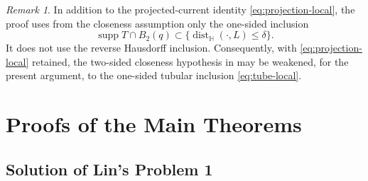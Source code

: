 \documentclass[11pt,reqno]{amsart}
\numberwithin{equation}{section}
\theoremstyle{definition}
\theoremstyle{remark}
\newtheorem{remark}[remark]{Remark}
\newcommand{\Hyp}{\mathbb H}
\newcommand{\supp}{\operatorname{supp}}
\newcommand{\dist}{\operatorname{dist}}
\begin{document}
\begin{remark}\label{rem:one-sided}
In addition to the projected-current identity
\eqref{eq:projection-local}, the proof uses from the closeness
assumption only the one-sided inclusion
\[
 \supp T\cap B_2(q)
 \subset \{\dist_{\Hyp}(\cdot,L)\le\delta\}.
\]
It does not use the reverse Hausdorff inclusion.  Consequently,
with \eqref{eq:projection-local} retained, the two-sided closeness
hypothesis in \cite[Lemma~3.2]{JiangXie} may be weakened, for the
present argument, to the one-sided tubular inclusion
\eqref{eq:tube-local}.
\end{remark}

\section{Proofs of the Main Theorems}\label{sec:proofs}

\subsection{Solution of Lin's Problem 1}
\end{document}
